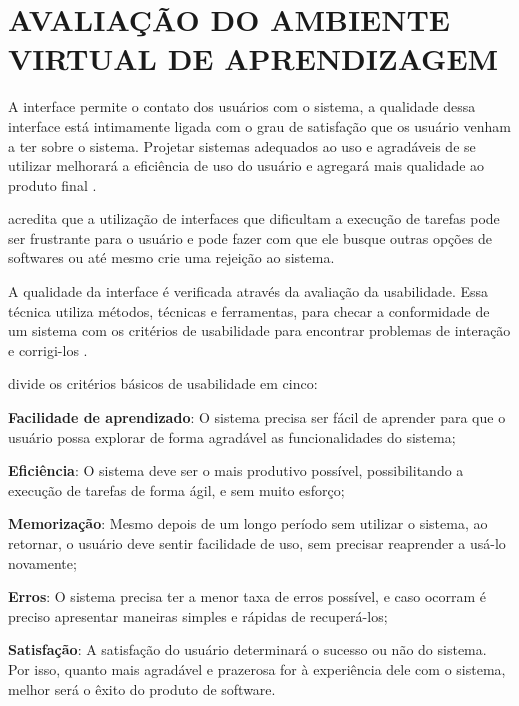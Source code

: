 \chapter{AVALIA\c{C}\~AO DO AMBIENTE VIRTUAL DE APRENDIZAGEM}
\label{chap:avaliacao-ambiente-virtual-aprendizagem}
\setcounter{table}{0}

A interface permite o contato dos usu\'arios com o sistema, a qualidade dessa interface est\'a intimamente ligada com o grau de 
satisfa\c{c}\~ao que os usu\'ario venham a ter sobre o sistema. Projetar sistemas adequados ao uso e agrad\'aveis de se utilizar
melhorar\'a a efici\^encia de uso do usu\'ario e agregará mais qualidade ao produto final \cite{antonino2015avaliacao}. 

 acredita que a utiliza\c{c}\~ao de interfaces que dificultam a execu\c{c}\~ao de tarefas 
pode ser frustrante para o usu\'ario e pode fazer com que ele busque outras op\c{c}\~oes de softwares ou at\'e mesmo crie uma 
rejei\c{c}\~ao ao sistema. 

A qualidade da interface \'e verificada atrav\'es da avalia\c{c}\~ao da usabilidade. Essa técnica utiliza m\'etodos, t\'ecnicas e 
ferramentas, para checar a conformidade de um sistema com os crit\'erios de usabilidade para encontrar problemas de intera\c{c}\~ao e 
corrigi-los \cite{antonino2015avaliacao}. 

 divide os critérios básicos de usabilidade em cinco:

\begin{alineascomponto}
	\item \textbf{Facilidade de aprendizado}: O sistema precisa ser fácil de aprender para que o usuário possa explorar de forma agradável as 
funcionalidades do sistema;
	\item \textbf{Eficiência}: O sistema deve ser o mais produtivo possível, possibilitando a execução de tarefas de forma ágil, e sem muito esforço;
	\item \textbf{Memorização}: Mesmo depois de um longo período sem utilizar o sistema, ao retornar, o usuário deve sentir facilidade de uso, sem 
precisar reaprender a usá-lo novamente;
	\item \textbf{Erros}: O sistema precisa ter a menor taxa de erros possível, e caso ocorram é preciso apresentar maneiras simples e rápidas de 
recuperá-los;
	\item \textbf{Satisfação}: A satisfação do usuário determinará o sucesso ou não do sistema. Por isso, quanto mais agradável e prazerosa for à 
experiência dele com o sistema, melhor será o êxito do produto de software.
\end{alineascomponto}

